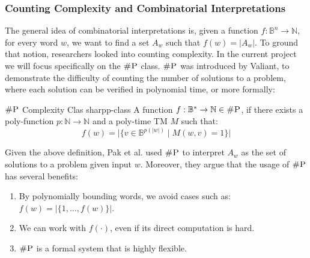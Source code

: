 



\subsubsection{Counting Complexity and Combinatorial Interpretations}

The general idea of combinatorial interpretations is, given a function \(f: \mathbb{B}^n \to \mathbb{N}\),
for every word \(w\), we want to find a set \(A_w\) such that \(f(w) = |A_w|\).
To ground that notion, researchers looked into counting complexity.
In the current project we will focus specifically on the \(\textsc{\#P}\) class.
\(\textsc{\#P}\) was introduced by Valiant\cite{valiant_ComplexityComputingPermanent_1979},
to demonstrate the difficulty of counting the number of solutions to a problem,
where each solution can be verified in polynomial time, or more formally:

\begin{definitionbox}{\(\textnormal{\textsc{\#P}}\) Complexity Clas \cite{valiant_ComplexityComputingPermanent_1979}}{sharpp-class}
	A function \(f: \mathbb{B}^* \to \mathbb{N} \in \textsc{\#P}\), if there exists a
	poly-function \(p : \mathbb{N} \to \mathbb{N}\) and a poly-time TM \(M\) such that:
	\[
		f(w) = \Big|\Big\{v \in \mathbb{B}^{p(|w|)} \mid M(w, v) =1 \Big\}\Big|
	\]
\end{definitionbox}

Given the above definition, Pak et al. \cite{pak_WhatCombinatorialInterpretation_2022, ikenmeyer_PositivitySymmetricGroup_2024}
used $\textsc{\#P}$ to interpret $A_w$ as the set of solutions to a problem given input $w$.
Moreover, they argue that the usage of $\textsc{\#P}$ has several benefits:

\begin{enumerate}
	\item By polynomially bounding words, we avoid cases such as: $f(w) = |\{1, \hdots, f(w)\}|$.
	\item We can work with $f(\cdot)$, even if its direct computation is hard.
	\item $\textsc{\#P}$ is a formal system that is highly flexible.
\end{enumerate}

